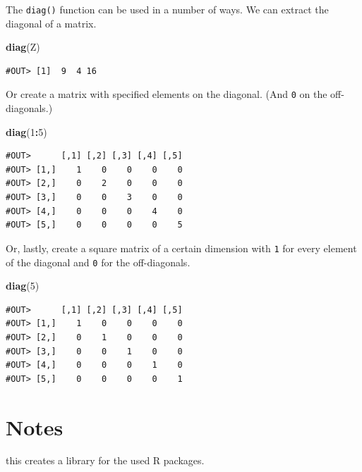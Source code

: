 \documentclass[]{book}
\newenvironment{Shaded}{\begin{snugshade}}{\end{snugshade}}
\newcommand{\KeywordTok}[1]{\textcolor[rgb]{0.13,0.29,0.53}{\textbf{#1}}}
\newcommand{\DecValTok}[1]{\textcolor[rgb]{0.00,0.00,0.81}{#1}}
\newcommand{\OperatorTok}[1]{\textcolor[rgb]{0.81,0.36,0.00}{\textbf{#1}}}
\newcommand{\NormalTok}[1]{#1}
\theoremstyle{definition}
\theoremstyle{definition}
\theoremstyle{definition}
\theoremstyle{remark}
\begin{document}
The \texttt{diag()} function can be used in a number of ways. We can
extract the diagonal of a matrix.

\begin{Shaded}
\begin{Highlighting}[]
\KeywordTok{diag}\NormalTok{(Z)}
\end{Highlighting}
\end{Shaded}

\begin{verbatim}
#OUT> [1]  9  4 16
\end{verbatim}

Or create a matrix with specified elements on the diagonal. (And
\texttt{0} on the off-diagonals.)

\begin{Shaded}
\begin{Highlighting}[]
\KeywordTok{diag}\NormalTok{(}\DecValTok{1}\OperatorTok{:}\DecValTok{5}\NormalTok{)}
\end{Highlighting}
\end{Shaded}

\begin{verbatim}
#OUT>      [,1] [,2] [,3] [,4] [,5]
#OUT> [1,]    1    0    0    0    0
#OUT> [2,]    0    2    0    0    0
#OUT> [3,]    0    0    3    0    0
#OUT> [4,]    0    0    0    4    0
#OUT> [5,]    0    0    0    0    5
\end{verbatim}

Or, lastly, create a square matrix of a certain dimension with
\texttt{1} for every element of the diagonal and \texttt{0} for the
off-diagonals.

\begin{Shaded}
\begin{Highlighting}[]
\KeywordTok{diag}\NormalTok{(}\DecValTok{5}\NormalTok{)}
\end{Highlighting}
\end{Shaded}

\begin{verbatim}
#OUT>      [,1] [,2] [,3] [,4] [,5]
#OUT> [1,]    1    0    0    0    0
#OUT> [2,]    0    1    0    0    0
#OUT> [3,]    0    0    1    0    0
#OUT> [4,]    0    0    0    1    0
#OUT> [5,]    0    0    0    0    1
\end{verbatim}

\chapter{Notes}\label{notes}

this creates a library for the used R packages.
\end{document}
